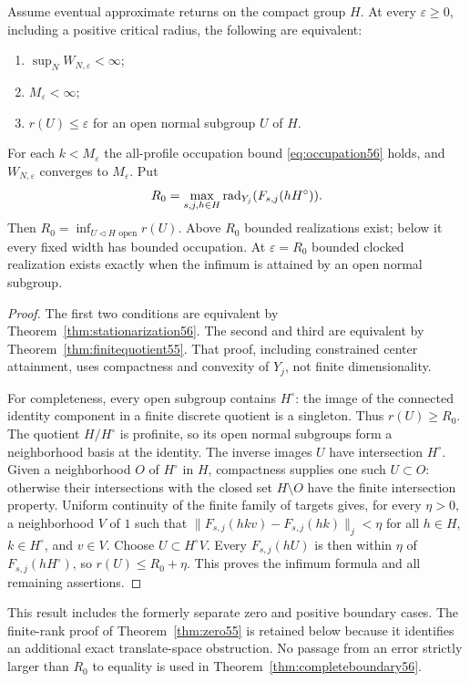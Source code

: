\begin{theorem}\label{thm:completeboundary56}
Assume eventual approximate returns on the compact group $H$. At every $\varepsilon\ge0$, including a positive critical radius, the following are equivalent:
\begin{enumerate}
\item $\sup_NW_{N,\varepsilon}<\infty$;
\item $M_\varepsilon<\infty$;
\item $r(U)\le\varepsilon$ for an open normal subgroup $U$ of $H$.
\end{enumerate}
For each $k<M_\varepsilon$ the all-profile occupation bound \eqref{eq:occupation56} holds, and $W_{N,\varepsilon}$ converges to $M_\varepsilon$. Put
\[
 R_0=\max_{s,j,h\in H}\operatorname{rad}_{Y_j}(F_{s,j}(hH^\circ)).
\]
Then $R_0=\inf_{U\lhd H\text{ open}}r(U)$. Above $R_0$ bounded realizations exist; below it every fixed width has bounded occupation. At $\varepsilon=R_0$ bounded clocked realization exists exactly when the infimum is attained by an open normal subgroup.
\end{theorem}
\begin{proof}
The first two conditions are equivalent by Theorem~\ref{thm:stationarization56}. The second and third are equivalent by Theorem~\ref{thm:finitequotient55}. That proof, including constrained center attainment, uses compactness and convexity of $Y_j$, not finite dimensionality.

For completeness, every open subgroup contains $H^\circ$: the image of the connected identity component in a finite discrete quotient is a singleton. Thus $r(U)\ge R_0$. The quotient $H/H^\circ$ is profinite, so its open normal subgroups form a neighborhood basis at the identity. The inverse images $U$ have intersection $H^\circ$. Given a neighborhood $O$ of $H^\circ$ in $H$, compactness supplies one such $U\subset O$: otherwise their intersections with the closed set $H\setminus O$ have the finite intersection property. Uniform continuity of the finite family of targets gives, for every $\eta>0$, a neighborhood $V$ of $1$ such that $\|F_{s,j}(hkv)-F_{s,j}(hk)\|_j<\eta$ for all $h\in H$, $k\in H^\circ$, and $v\in V$. Choose $U\subset H^\circ V$. Every $F_{s,j}(hU)$ is then within $\eta$ of $F_{s,j}(hH^\circ)$, so $r(U)\le R_0+\eta$. This proves the infimum formula and all remaining assertions.
\end{proof}
This result includes the formerly separate zero and positive boundary cases. The finite-rank proof of Theorem~\ref{thm:zero55} is retained below because it identifies an additional exact translate-space obstruction. No passage from an error strictly larger than $R_0$ to equality is used in Theorem~\ref{thm:completeboundary56}.

